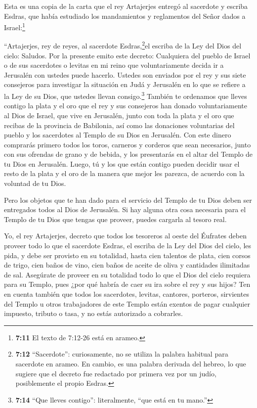  Esta es una copia de la carta que el rey Artajerjes
entregó al sacerdote y escriba Esdras, que había estudiado los
mandamientos y reglamentos del Señor dados a Israel:\footnote{\textbf{7:11}
  El texto de 7:12-26 está en arameo.}

 ``Artajerjes, rey de reyes, al sacerdote
Esdras,\footnote{\textbf{7:12} ``Sacerdote'': curiosamente, no se
  utiliza la palabra habitual para sacerdote en arameo. En cambio, es
  una palabra derivada del hebreo, lo que sugiere que el decreto fue
  redactado por primera vez por un judío, posiblemente el propio Esdras.}el
escriba de la Ley del Dios del cielo: Saludos.  Por la
presente emito este decreto: Cualquiera del pueblo de Israel o de sus
sacerdotes o levitas en mi reino que voluntariamente decida ir a
Jerusalén con ustedes puede hacerlo.  Ustedes son enviados
por el rey y sus siete consejeros para investigar la situación en Judá y
Jerusalén en lo que se refiere a la Ley de su Dios, que ustedes llevan
consigo.\footnote{\textbf{7:14} ``Que lleves contigo'': literalmente,
  ``que está en tu mano.''}  También te ordenamos que
lleves contigo la plata y el oro que el rey y sus consejeros han donado
voluntariamente al Dios de Israel, que vive en Jerusalén, 
junto con toda la plata y el oro que recibas de la provincia de
Babilonia, así como las donaciones voluntarias del pueblo y los
sacerdotes al Templo de su Dios en Jerusalén.  Con este
dinero comprarás primero todos los toros, carneros y corderos que sean
necesarios, junto con sus ofrendas de grano y de bebida, y los
presentarás en el altar del Templo de tu Dios en Jerusalén.
 Luego, tú y los que están contigo pueden decidir usar el
resto de la plata y el oro de la manera que mejor les parezca, de
acuerdo con la voluntad de tu Dios.

 Pero los objetos que te han dado para el servicio del
Templo de tu Dios deben ser entregados todos al Dios de Jerusalén.
 Si hay alguna otra cosa necesaria para el Templo de tu
Dios que tengas que proveer, puedes cargarla al tesoro real.

 Yo, el rey Artajerjes, decreto que todos los tesoreros al
oeste del Éufrates deben proveer todo lo que el sacerdote Esdras, el
escriba de la Ley del Dios del cielo, les pida, y debe ser provisto en
su totalidad,  hasta cien talentos de plata, cien corsos de
trigo, cien baños de vino, cien baños de aceite de oliva y cantidades
ilimitadas de sal.  Asegúrate de proveer en su totalidad
todo lo que el Dios del cielo requiera para su Templo, pues ¿por qué
habría de caer su ira sobre el rey y sus hijos?  Ten en
cuenta también que todos los sacerdotes, levitas, cantores, porteros,
sirvientes del Templo u otros trabajadores de este Templo están exentos
de pagar cualquier impuesto, tributo o tasa, y no estás autorizado a
cobrarles.

